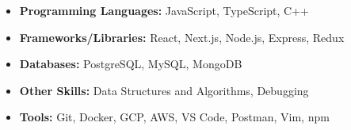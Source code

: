 \documentclass[10pt,a4paper,ragged2e]{altacv}
\begin{document}

\smallskip
\smallskip
\smallskip

\smallskip
\begin{itemize}
\item \textbf{Programming Languages: }\small {JavaScript, TypeScript, C++}\smallskip
  \item \textbf{Frameworks/Libraries:}\small{ React, Next.js, Node.js, Express, Redux}\smallskip
  \item \textbf{Databases: }\small{PostgreSQL, MySQL, MongoDB}
   \smallskip
   \item \textbf{Other Skills: }\small{Data Structures and Algorithms, Debugging}\smallskip
  \item \textbf{Tools: }\small{Git, Docker, GCP, AWS, VS Code, Postman, Vim, npm}\smallskip
\end{itemize}






\end{document}
